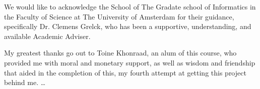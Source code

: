 \begin{acknowledgements}
    \addchaptertocentry{\acknowledgementname}
    We would like to acknowledge the School of The Gradate school of Informatics in the Faculty of Science at The University of Amsterdam for their guidance, specifically Dr. Clemens Grelck, who has been a supportive, understanding, and available Academic Adviser.
    
    My greatest thanks go out to Toine Khonraad, an alum of this course, who provided me with moral and monetary support, as well as wisdom and friendship that aided in the completion of this, my fourth attempt at getting this project behind me. 
    \ldots
\end{acknowledgements}